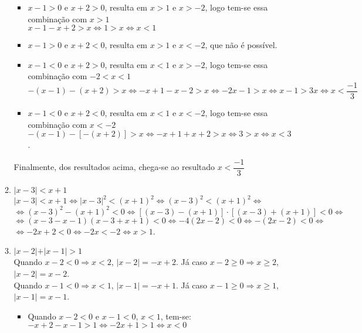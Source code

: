 \begin{enumerate}
\begin{enumerate}
		\begin{itemize}
		\item
		$x-1 > 0$ e $x +2 >0$, resulta em $x > 1$ e $x > -2$, logo tem-se essa combinação com $x > 1$\\
		$x-1-x+2>x \Leftrightarrow 1>x \Leftrightarrow x <1$
		\item
		$x-1 > 0$ e $x +2 <0$, resulta em $x > 1$ e $x < -2$, que não é possível.
		\item
		$x-1 < 0$ e $x +2 >0$, resulta em $x < 1$ e $x > -2$, logo tem-se essa combinação com $-2 < x < 1$\\
		$-(x-1) -(x + 2) >x \Leftrightarrow -x+1 - x -2 >x \Leftrightarrow  -2x-1>x \Leftrightarrow x -1 > 3x \Leftrightarrow x < \dfrac{-1}{3}$
		\item
		$x-1 < 0$ e $x +2 <0$, resulta em $x < 1$ e $x < -2$, logo tem-se essa combinação com $x < -2$\\
		$-(x-1) -[-(x+2)] >x \Leftrightarrow -x + 1 +x + 2 > x \Leftrightarrow 3 >x \Leftrightarrow x < 3$.
		\end{itemize}
		Finalmente, dos resultados acima, chega-se ao resultado $x < \dfrac{-1}{3}$
		\item %
		$\vert x - 3 \vert < x + 1$\\
		$\vert x - 3 \vert < x + 1 \Leftrightarrow \vert x - 3 \vert^2 < (x + 1)^2 \Leftrightarrow (x - 3)^2 < (x + 1)^2 \Leftrightarrow$\\
		$\Leftrightarrow (x - 3)^2 - (x + 1)^2 < 0 \Leftrightarrow [(x - 3) - (x + 1)]\cdot[(x - 3) + (x + 1)] < 0\Leftrightarrow$\\
		$\Leftrightarrow (x - 3 - x - 1)(x - 3 + x + 1) < 0 \Leftrightarrow -4(2x - 2) < 0 \Leftrightarrow -(2x - 2) < 0 \Leftrightarrow$\\
		$\Leftrightarrow -2x + 2 < 0 \Leftrightarrow -2x < - 2 \Leftrightarrow x > 1$.
		\item %
		$\vert x - 2 \vert + \vert x-1 \vert > 1$\\
		Quando $x - 2 < 0 \Rightarrow x < 2$, $\vert x - 2 \vert = -x+2$. Já caso $x - 2 \geq 0 \Rightarrow x \geq 2$,  $\vert x - 2 \vert = x - 2$.\\ 
		 Quando $x-1<0 \Rightarrow x < 1$, $\vert x-1 \vert = -x + 1$. Já caso $x-1 \geq 0 \Rightarrow x \geq 1$, $\vert x - 1 \vert = x - 1$.
		 \begin{itemize}
		 \item 
		 Quando $x -2 < 0$ e $x - 1 < 0$, $x < 1$, tem-se:\\
		 $-x + 2 - x - 1 > 1 \Leftrightarrow -2x +1 > 1 \Leftrightarrow x < 0$

\end{itemize}
\end{enumerate}
\end{enumerate}
